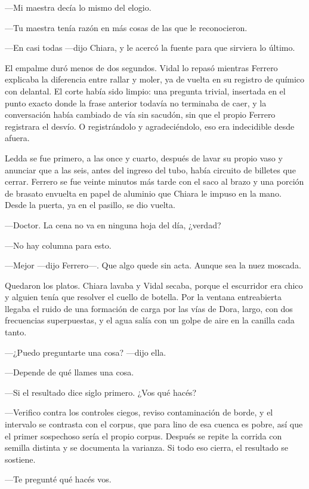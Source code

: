 ---Mi maestra decía lo mismo del elogio.

---Tu maestra tenía razón en más cosas de las que le reconocieron.

---En casi todas ---dijo Chiara, y le acercó la fuente para que sirviera lo último.

El empalme duró menos de dos segundos. Vidal lo repasó mientras Ferrero explicaba la diferencia entre rallar y moler, ya de vuelta en su registro de químico con delantal. El corte había sido limpio: una pregunta trivial, insertada en el punto exacto donde la frase anterior todavía no terminaba de caer, y la conversación había cambiado de vía sin sacudón, sin que el propio Ferrero registrara el desvío. O registrándolo y agradeciéndolo, eso era indecidible desde afuera.

Ledda se fue primero, a las once y cuarto, después de lavar su propio vaso y anunciar que a las seis, antes del ingreso del tubo, había circuito de billetes que cerrar. Ferrero se fue veinte minutos más tarde con el saco al brazo y una porción de brasato envuelta en papel de aluminio que Chiara le impuso en la mano. Desde la puerta, ya en el pasillo, se dio vuelta.

---Doctor. La cena no va en ninguna hoja del día, ¿verdad?

---No hay columna para esto.

---Mejor ---dijo Ferrero---. Que algo quede sin acta. Aunque sea la nuez moscada.

Quedaron los platos. Chiara lavaba y Vidal secaba, porque el escurridor era chico y alguien tenía que resolver el cuello de botella. Por la ventana entreabierta llegaba el ruido de una formación de carga por las vías de Dora, largo, con dos frecuencias superpuestas, y el agua salía con un golpe de aire en la canilla cada tanto.

---¿Puedo preguntarte una cosa? ---dijo ella.

---Depende de qué llames una cosa.

---Si el resultado dice siglo primero. ¿Vos qué hacés?

---Verifico contra los controles ciegos, reviso contaminación de borde, y el intervalo se contrasta con el corpus, que para lino de esa cuenca es pobre, así que el primer sospechoso sería el propio corpus. Después se repite la corrida con semilla distinta y se documenta la varianza. Si todo eso cierra, el resultado se sostiene.

---Te pregunté qué hacés vos.

